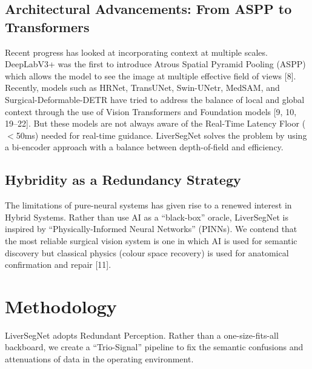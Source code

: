 \documentclass[conference]{IEEEtran}
\begin{document}
\subsection{Architectural Advancements: From ASPP to Transformers}
Recent progress has looked at incorporating context at multiple scales. DeepLabV3+ was the first to introduce Atrous Spatial Pyramid Pooling (ASPP) which allows the model to see the image at multiple effective field of views [8]. Recently, models such as HRNet, TransUNet, Swin-UNetr, MedSAM, and Surgical-Deformable-DETR have tried to address the balance of local and global context through the use of Vision Transformers and Foundation models [9, 10, 19--22]. But these models are not always aware of the Real-Time Latency Floor ($<$50ms) needed for real-time guidance. LiverSegNet solves the problem by using a bi-encoder approach with a balance between depth-of-field and efficiency.

\subsection{Hybridity as a Redundancy Strategy}
The limitations of pure-neural systems has given rise to a renewed interest in Hybrid Systems. Rather than use AI as a ``black-box'' oracle, LiverSegNet is inspired by ``Physically-Informed Neural Networks'' (PINNs). We contend that the most reliable surgical vision system is one in which AI is used for semantic discovery but classical physics (colour space recovery) is used for anatomical confirmation and repair [11].

\section{Methodology}
LiverSegNet adopts Redundant Perception. Rather than a one-size-fits-all backboard, we create a ``Trio-Signal'' pipeline to fix the semantic confusions and attenuations of data in the operating environment.
\end{document}
